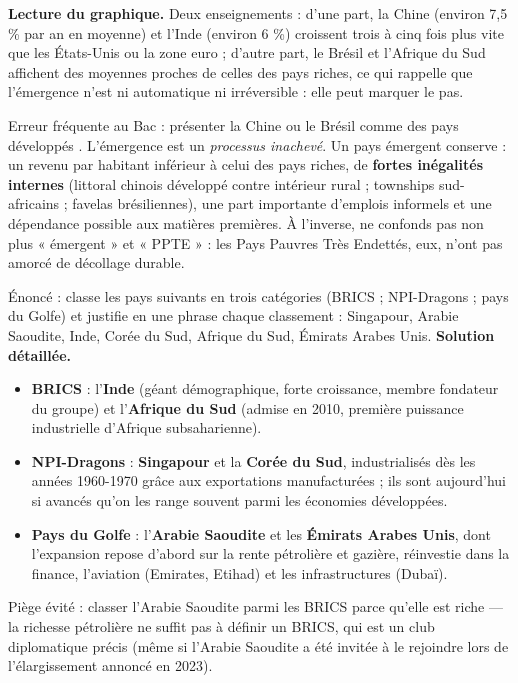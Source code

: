 \documentclass[11pt]{article}
\begin{document}
\textbf{Lecture du graphique.} Deux enseignements : d'une part, la Chine (environ 7,5 \% par an en moyenne) et l'Inde (environ 6 \%) croissent trois à cinq fois plus vite que les États-Unis ou la zone euro ; d'autre part, le Brésil et l'Afrique du Sud affichent des moyennes proches de celles des pays riches, ce qui rappelle que l'émergence n'est ni automatique ni irréversible : elle peut marquer le pas.

\begin{attention}
Erreur fréquente au Bac : présenter la Chine ou le Brésil comme des pays \og développés \fg{}. L'émergence est un \emph{processus inachevé}. Un pays émergent conserve : un revenu par habitant inférieur à celui des pays riches, de \textbf{fortes inégalités internes} (littoral chinois développé contre intérieur rural ; townships sud-africains ; favelas brésiliennes), une part importante d'emplois informels et une dépendance possible aux matières premières. À l'inverse, ne confonds pas non plus « émergent » et « PPTE » : les Pays Pauvres Très Endettés, eux, n'ont pas amorcé de décollage durable.
\end{attention}

\begin{exoresolu}
Énoncé : classe les pays suivants en trois catégories (BRICS ; NPI-Dragons ; pays du Golfe) et justifie en une phrase chaque classement : Singapour, Arabie Saoudite, Inde, Corée du Sud, Afrique du Sud, Émirats Arabes Unis.
\tcblower
\textbf{Solution détaillée.}
\begin{itemize}
\item \textbf{BRICS} : l'\textbf{Inde} (géant démographique, forte croissance, membre fondateur du groupe) et l'\textbf{Afrique du Sud} (admise en 2010, première puissance industrielle d'Afrique subsaharienne).
\item \textbf{NPI-Dragons} : \textbf{Singapour} et la \textbf{Corée du Sud}, industrialisés dès les années 1960-1970 grâce aux exportations manufacturées ; ils sont aujourd'hui si avancés qu'on les range souvent parmi les économies développées.
\item \textbf{Pays du Golfe} : l'\textbf{Arabie Saoudite} et les \textbf{Émirats Arabes Unis}, dont l'expansion repose d'abord sur la rente pétrolière et gazière, réinvestie dans la finance, l'aviation (Emirates, Etihad) et les infrastructures (Dubaï).
\end{itemize}
Piège évité : classer l'Arabie Saoudite parmi les BRICS parce qu'elle est riche — la richesse pétrolière ne suffit pas à définir un BRICS, qui est un club diplomatique précis (même si l'Arabie Saoudite a été invitée à le rejoindre lors de l'élargissement annoncé en 2023).
\end{exoresolu}
\end{document}
